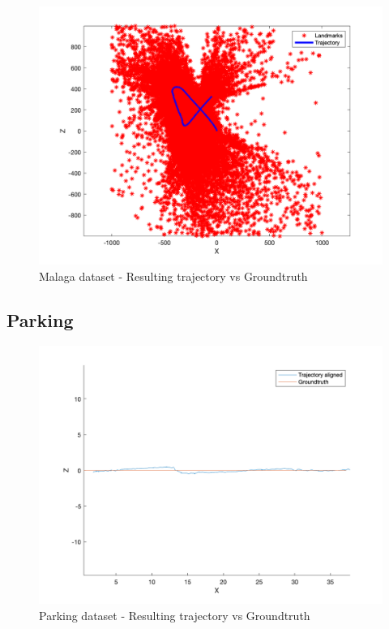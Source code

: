 \documentclass[letterpaper, 12 pt]{article}
\begin{document}
\begin{multicols*}{2}
\begin{figure}[H]
\begin{center}
\includegraphics[width=\linewidth]{malaga.png}
\end{center}
\caption{Malaga dataset - Resulting trajectory vs Groundtruth}
\label{fig:results_malaga}
\end{figure}

\subsection{Parking}

\begin{figure}[H]
\begin{center}
\includegraphics[width=\linewidth]{parking.png}
\end{center}
\caption{Parking dataset - Resulting trajectory vs Groundtruth}
\label{fig:results_parking}
\end{figure}


\end{multicols*}
\end{document}
